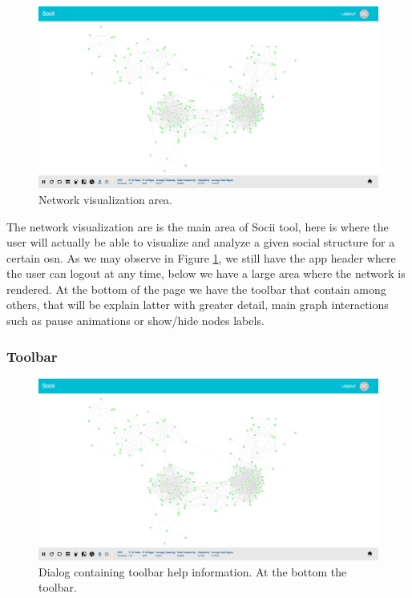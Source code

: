 \begin{figure}[h!]
\begin{center}
  \hspace*{-0.8in}
  \includegraphics[width=1.2\textwidth]{img/socii/socii_3.png}
\end{center}
\caption{\label{img:socii_3} Network visualization area.}
\end{figure}

The network visualization are is the main area of Socii tool, here is where the user will actually be able to visualize and analyze a given social structure for a certain \gls{osn}. As we may observe in Figure \ref{img:socii_3}, we still have the app header where the user can logout at any time, below we have a large area where the network is rendered. At the bottom of the page we have the toolbar that contain among others, that will be explain latter with greater detail, main graph interactions such as pause animations or show/hide nodes labels.

\subsubsection{Toolbar}

\begin{figure}[h!]
\begin{center}
  \hspace*{-0.8in}
  \includegraphics[width=1.2\textwidth]{img/socii/socii_3.png}
\end{center}
\caption{\label{img:socii_4} Dialog containing toolbar help information. At the bottom the toolbar.}
\end{figure}

